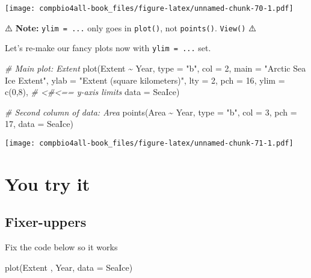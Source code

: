 \documentclass[
]{book}
\newenvironment{Shaded}{\begin{snugshade}}{\end{snugshade}}
\newcommand{\AttributeTok}[1]{\textcolor[rgb]{0.77,0.63,0.00}{#1}}
\newcommand{\CommentTok}[1]{\textcolor[rgb]{0.56,0.35,0.01}{\textit{#1}}}
\newcommand{\DecValTok}[1]{\textcolor[rgb]{0.00,0.00,0.81}{#1}}
\newcommand{\FunctionTok}[1]{\textcolor[rgb]{0.00,0.00,0.00}{#1}}
\newcommand{\NormalTok}[1]{#1}
\newcommand{\SpecialCharTok}[1]{\textcolor[rgb]{0.00,0.00,0.00}{#1}}
\newcommand{\StringTok}[1]{\textcolor[rgb]{0.31,0.60,0.02}{#1}}
\begin{document}
\texttt{[image: compbio4all-book\_files/figure-latex/unnamed-chunk-70-1.pdf]}

⚠️ \textbf{Note:} \texttt{ylim\ =\ ...} only goes in \texttt{plot()}, not \texttt{points()}. \texttt{View()} ⚠️

Let's re-make our fancy plots now with \texttt{ylim\ =\ ...} set.

\begin{Shaded}
\begin{Highlighting}[]
\CommentTok{\# Main plot: Extent}
\FunctionTok{plot}\NormalTok{(Extent }\SpecialCharTok{\textasciitilde{}}\NormalTok{ Year,  }
     \AttributeTok{type =} \StringTok{"b"}\NormalTok{,     }
     \AttributeTok{col =} \DecValTok{2}\NormalTok{,       }
     \AttributeTok{main =} \StringTok{"Arctic Sea Ice Extent"}\NormalTok{, }
     \AttributeTok{ylab =} \StringTok{"Extent (square kilometers)"}\NormalTok{,}
     \AttributeTok{lty =} \DecValTok{2}\NormalTok{,        }
     \AttributeTok{pch =} \DecValTok{16}\NormalTok{,       }
     \AttributeTok{ylim =} \FunctionTok{c}\NormalTok{(}\DecValTok{0}\NormalTok{,}\DecValTok{8}\NormalTok{), }\CommentTok{\# \textless{}\#\textless{}== y{-}axis limits}
     \AttributeTok{data =}\NormalTok{ SeaIce)  }

\CommentTok{\# Second column of data: Area}
\FunctionTok{points}\NormalTok{(Area }\SpecialCharTok{\textasciitilde{}}\NormalTok{ Year,}
       \AttributeTok{type =} \StringTok{"b"}\NormalTok{,}
       \AttributeTok{col =} \DecValTok{3}\NormalTok{,}
       \AttributeTok{pch =} \DecValTok{17}\NormalTok{,}
       \AttributeTok{data =}\NormalTok{ SeaIce)}
\end{Highlighting}
\end{Shaded}

\texttt{[image: compbio4all-book\_files/figure-latex/unnamed-chunk-71-1.pdf]}

\hypertarget{you-try-it}{%
\section{You try it}\label{you-try-it}}

\hypertarget{fixer-uppers}{%
\subsection{Fixer-uppers}\label{fixer-uppers}}

Fix the code below so it works

\begin{Shaded}
\begin{Highlighting}[]
\FunctionTok{plot}\NormalTok{(Extent , Year,  }
     \AttributeTok{data =}\NormalTok{ SeaIce)  }
\end{Highlighting}
\end{Shaded}
\end{document}
